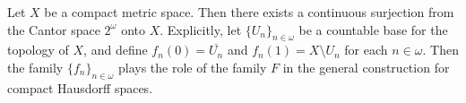 Let $X$ be a compact metric space. Then there exists a continuous surjection from the Cantor space $2^\omega$ onto $X$. Explicitly, let $\{U_n\}_{n \in \omega}$ be a countable base for the topology of $X$, and define $f_n(0) = \overline{U_n}$ and $f_n(1) = X \setminus U_n$ for each $n \in \omega$. Then the family $\{f_n\}_{n \in \omega}$ plays the role of the family $F$ in the general construction for compact Hausdorff spaces.
